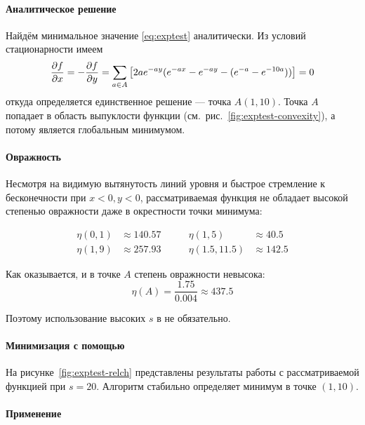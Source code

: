 \paragraph{Аналитическое решение}

Найдём минимальное значение \eqref{eq:exptest} аналитически. Из
условий стационарности имеем
\begin{equation*}
  \frac{\partial{f}}{\partial{x}} = -\frac{\partial{f}}{\partial{y}} =\sum\limits_{a\in A}\left[2ae^{-ay}(e^{-ax}-e^{-ay}-(e^{-a}-e^{-10a}))\right] = 0
\end{equation*}
откуда определяется единственное решение — точка $A (1,10)$. Точка $A$
попадает в область выпуклости функции
(см. рис. \ref{fig:exptest-convexity}), а потому является глобальным
минимумом.

\paragraph{Овражность}

Несмотря на видимую вытянутость линий уровня и быстрое стремление к
бесконечности при $x<0,y<0$, рассматриваемая функция не обладает
высокой степенью овражности даже в окрестности точки минимума:

\begin{equation}
  \begin{aligned}
    \eta(0,1) &\approx 140.57&\qquad
    \eta(1,5) &\approx 40.5\\
    \eta(1,9) &\approx 257.93&\qquad
    \eta(1.5,11.5) &\approx 142.5
\end{aligned}
\end{equation}

Как оказывается, и в точке $A$ степень овражности невысока:
\begin{equation*}
  \eta(A) = \frac{1.75}{0.004} \approx 437.5
\end{equation*}

Поэтому использование высоких $s$ в \relch{} не обязательно.

\paragraph{Минимизация с помощью \relch{}}

На рисунке \ref{fig:exptest-relch} представлены результаты работы
\relch{} с рассматриваемой функцией при $s=20$. Алгоритм стабильно
определяет минимум в точке $(1, 10)$.

\paragraph{Применение \gdrelch{}}

